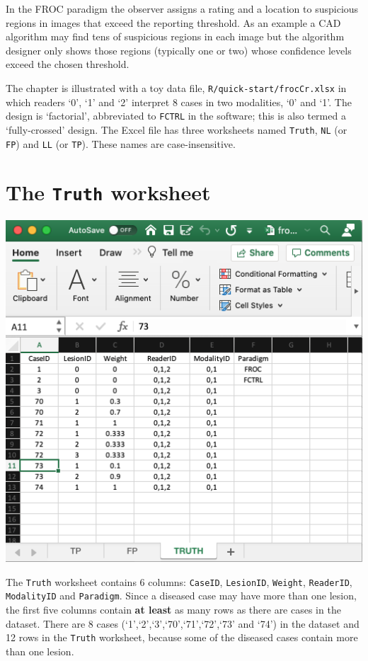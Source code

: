 \documentclass[
]{book}
\begin{document}
In the FROC paradigm the observer assigns a rating and a location to suspicious regions in images that exceed the reporting threshold. As an example a CAD algorithm may find tens of suspicious regions in each image but the algorithm designer only shows those regions (typically one or two) whose confidence levels exceed the chosen threshold.

The chapter is illustrated with a toy data file, \texttt{R/quick-start/frocCr.xlsx} in which readers `0', `1' and `2' interpret 8 cases in two modalities, `0' and `1'. The design is `factorial', abbreviated to \texttt{FCTRL} in the software; this is also termed a `fully-crossed' design. The Excel file has three worksheets named \texttt{Truth}, \texttt{NL} (or \texttt{FP}) and \texttt{LL} (or \texttt{TP}). These names are case-insensitive.

\hypertarget{quick-start-froc-data-truth}{%
\section{\texorpdfstring{The \texttt{Truth} worksheet}{The Truth worksheet}}\label{quick-start-froc-data-truth}}

\includegraphics[width=1\textwidth,height=\textheight]{images/quick-start/frocCrTruth.png}

The \texttt{Truth} worksheet contains 6 columns: \texttt{CaseID}, \texttt{LesionID}, \texttt{Weight}, \texttt{ReaderID}, \texttt{ModalityID} and \texttt{Paradigm}. Since a diseased case may have more than one lesion, the first five columns contain \textbf{at least} as many rows as there are cases in the dataset. There are 8 cases (`1',`2',`3',`70',`71',`72',`73' and `74') in the dataset and 12 rows in the \texttt{Truth} worksheet, because some of the diseased cases contain more than one lesion.
\end{document}
